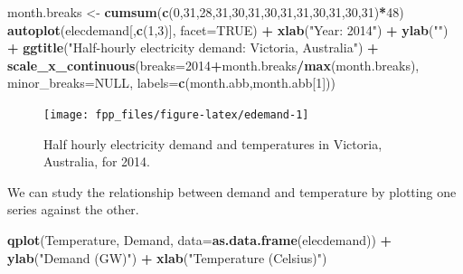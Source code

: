 \documentclass[]{book}
\newenvironment{Shaded}{\begin{snugshade}}{\end{snugshade}}
\newcommand{\DataTypeTok}[1]{\textcolor[rgb]{0.13,0.29,0.53}{#1}}
\newcommand{\DecValTok}[1]{\textcolor[rgb]{0.00,0.00,0.81}{#1}}
\newcommand{\KeywordTok}[1]{\textcolor[rgb]{0.13,0.29,0.53}{\textbf{#1}}}
\newcommand{\NormalTok}[1]{#1}
\newcommand{\OperatorTok}[1]{\textcolor[rgb]{0.81,0.36,0.00}{\textbf{#1}}}
\newcommand{\OtherTok}[1]{\textcolor[rgb]{0.56,0.35,0.01}{#1}}
\newcommand{\StringTok}[1]{\textcolor[rgb]{0.31,0.60,0.02}{#1}}
\begin{document}
\begin{Shaded}
\begin{Highlighting}[]
\NormalTok{month.breaks <-}\StringTok{ }\KeywordTok{cumsum}\NormalTok{(}\KeywordTok{c}\NormalTok{(}\DecValTok{0}\NormalTok{,}\DecValTok{31}\NormalTok{,}\DecValTok{28}\NormalTok{,}\DecValTok{31}\NormalTok{,}\DecValTok{30}\NormalTok{,}\DecValTok{31}\NormalTok{,}\DecValTok{30}\NormalTok{,}\DecValTok{31}\NormalTok{,}\DecValTok{31}\NormalTok{,}\DecValTok{30}\NormalTok{,}\DecValTok{31}\NormalTok{,}\DecValTok{30}\NormalTok{,}\DecValTok{31}\NormalTok{)}\OperatorTok{*}\DecValTok{48}\NormalTok{)}
\KeywordTok{autoplot}\NormalTok{(elecdemand[,}\KeywordTok{c}\NormalTok{(}\DecValTok{1}\NormalTok{,}\DecValTok{3}\NormalTok{)], }\DataTypeTok{facet=}\OtherTok{TRUE}\NormalTok{) }\OperatorTok{+}
\StringTok{  }\KeywordTok{xlab}\NormalTok{(}\StringTok{"Year: 2014"}\NormalTok{) }\OperatorTok{+}\StringTok{ }\KeywordTok{ylab}\NormalTok{(}\StringTok{""}\NormalTok{) }\OperatorTok{+}
\StringTok{  }\KeywordTok{ggtitle}\NormalTok{(}\StringTok{"Half-hourly electricity demand: Victoria, Australia"}\NormalTok{) }\OperatorTok{+}
\StringTok{  }\KeywordTok{scale_x_continuous}\NormalTok{(}\DataTypeTok{breaks=}\DecValTok{2014}\OperatorTok{+}\NormalTok{month.breaks}\OperatorTok{/}\KeywordTok{max}\NormalTok{(month.breaks), }
    \DataTypeTok{minor_breaks=}\OtherTok{NULL}\NormalTok{, }\DataTypeTok{labels=}\KeywordTok{c}\NormalTok{(month.abb,month.abb[}\DecValTok{1}\NormalTok{]))}
\end{Highlighting}
\end{Shaded}

\begin{figure}

{\centering \texttt{[image: fpp\_files/figure-latex/edemand-1]} 

}

\caption{Half hourly electricity demand and temperatures in Victoria, Australia, for 2014.}\label{fig:edemand}
\end{figure}

We can study the relationship between demand and temperature by plotting one series against the other.

\begin{Shaded}
\begin{Highlighting}[]
\KeywordTok{qplot}\NormalTok{(Temperature, Demand, }\DataTypeTok{data=}\KeywordTok{as.data.frame}\NormalTok{(elecdemand)) }\OperatorTok{+}
\StringTok{  }\KeywordTok{ylab}\NormalTok{(}\StringTok{"Demand (GW)"}\NormalTok{) }\OperatorTok{+}\StringTok{ }\KeywordTok{xlab}\NormalTok{(}\StringTok{"Temperature (Celsius)"}\NormalTok{)}
\end{Highlighting}
\end{Shaded}
\end{document}
